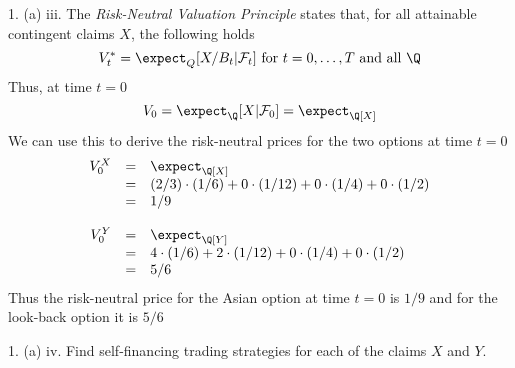\documentclass[11pt,a4paper]{article}
\begin{document}
\begin{answer}{1. (a) iii.}
  The \textit{Risk-Neutral Valuation Principle} states that, for all attainable contingent claims $X$, the following holds
  \[ V_t^*=\expect_Q[X/B_t|\mathcal{F}_t]\text{ for }t=0,\dots,T\text{ and all }\Q \]
  Thus, at time $t=0$
  \[ V_0=\expect_\Q[X|\mathcal{F}_0]=\expect_\Q[X] \]
  We can use this to derive the risk-neutral prices for the two options at time $t=0$
  \[\begin{array}{rcl}
    V_0^X&=&\expect_\Q[X]\\
    &=&(2/3)\cdot(1/6)+0\cdot(1/12)+0\cdot(1/4)+0\cdot(1/2)\\
    &=&1/9\\\\
    V_0^Y&=&\expect_\Q[Y]\\
    &=&4\cdot(1/6)+2\cdot(1/12)+0\cdot(1/4)+0\cdot(1/2)\\
    &=&5/6
  \end{array}\]
  Thus the risk-neutral price for the Asian option at time $t=0$ is $1/9$ and for the look-back option it is $5/6$
\end{answer}

\begin{question}{1. (a) iv.}
  Find self-financing trading strategies for each of the claims $X$ and $Y$.
\end{question}
\end{document}
